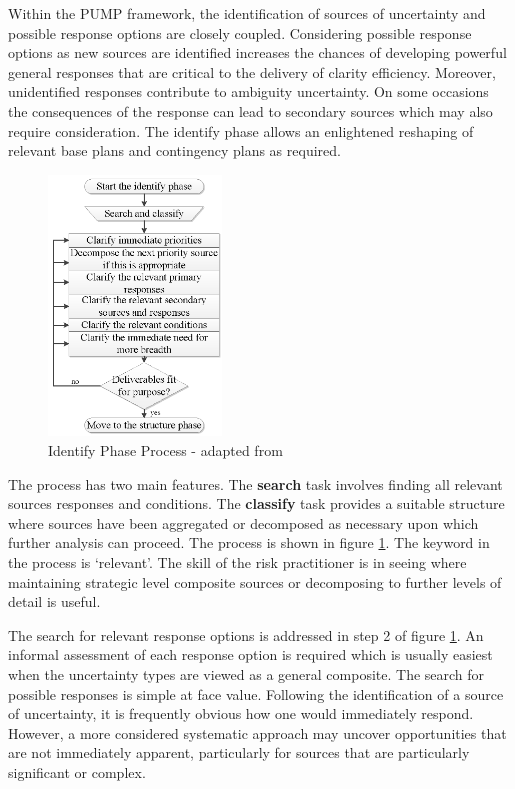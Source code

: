 Within the PUMP framework, the identification of sources of uncertainty and possible response options are closely coupled. 
Considering possible response options as new sources are identified increases the chances of developing powerful general responses that are critical to the delivery of clarity efficiency. 
Moreover, unidentified responses contribute to ambiguity uncertainty. 
On some occasions the consequences of the response can lead to secondary sources which may also require consideration.
The identify phase allows an enlightened reshaping of relevant base plans and contingency plans as required.

\begin{figure}[!h]
  \centering
    \includegraphics[width = 0.41\textwidth]{./Figures/Identify.png} 
\caption{Identify Phase Process - adapted from \cite{chapman}}
\label{Figure:Identify}
\end{figure}

The process has two main features. 
The \textbf{search} task involves finding all relevant sources responses and conditions. 
The \textbf{classify} task provides a suitable structure where sources have been aggregated or decomposed as necessary upon which further analysis can proceed.
The process is shown in figure \ref{Figure:Identify}.
The keyword in the process is `relevant'. 
The skill of the risk practitioner is in seeing where maintaining strategic level composite sources or decomposing to further levels of detail is useful.

The search for relevant response options is addressed in step 2 of figure \ref{Figure:Identify}.
An informal assessment of each response option is required which is usually easiest when the uncertainty types are viewed as a general composite.
The search for possible responses is simple at face value.
Following the identification of a source of uncertainty, it is frequently obvious how one would immediately respond.
However, a more considered systematic approach may uncover opportunities that are not immediately apparent, particularly for sources that are particularly significant or complex.

